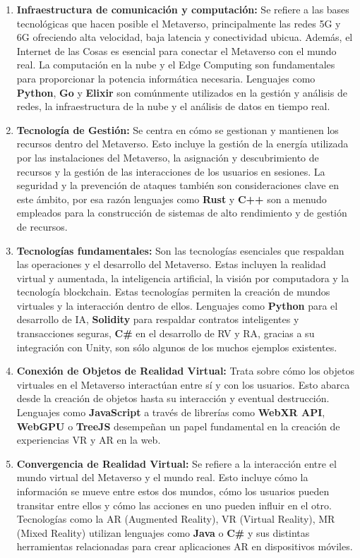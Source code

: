 \documentclass[a4paper,10pt]{article}
\begin{document}
	\begin{enumerate}
		\item \textbf{Infraestructura de comunicación y computación:} Se refiere a las bases tecnológicas que hacen posible el Metaverso, principalmente las redes 5G y 6G ofreciendo alta velocidad, baja latencia y conectividad ubicua. Además, el Internet de las Cosas es esencial para conectar el Metaverso con el mundo real. La computación en la nube y el Edge Computing son fundamentales para proporcionar la potencia informática necesaria. Lenguajes como \textbf{Python}, \textbf{Go} y \textbf{Elixir} son comúnmente utilizados en la gestión y análisis de redes, la infraestructura de la nube y el análisis de datos en tiempo real.
		\item \textbf{Tecnología de Gestión:} Se centra en cómo se gestionan y mantienen los recursos dentro del Metaverso. Esto incluye la gestión de la energía utilizada por las instalaciones del Metaverso, la asignación y descubrimiento de recursos y la gestión de las interacciones de los usuarios en sesiones. La seguridad y la prevención de ataques también son consideraciones clave en este ámbito, por esa razón lenguajes como \textbf{Rust} y \textbf{C++} son a menudo empleados para la construcción de sistemas de alto rendimiento y de gestión de recursos.
		\item \textbf{Tecnologías fundamentales:} Son las tecnologías esenciales que respaldan las operaciones y el desarrollo del Metaverso. Estas incluyen la realidad virtual y aumentada, la inteligencia artificial, la visión por computadora y la tecnología blockchain. Estas tecnologías permiten la creación de mundos virtuales y la interacción dentro de ellos. Lenguajes como \textbf{Python} para el desarrollo de IA, \textbf{Solidity} para respaldar contratos inteligentes y transacciones seguras, \textbf{C\#} en el desarrollo de RV y RA, gracias a su integración con Unity, son sólo algunos de los muchos ejemplos existentes.
		\item \textbf{Conexión de Objetos de Realidad Virtual:} Trata sobre cómo los objetos virtuales en el Metaverso interactúan entre sí y con los usuarios. Esto abarca desde la creación de objetos hasta su interacción y eventual destrucción. Lenguajes como \textbf{JavaScript} a través de librerías como \textbf{WebXR API}, \textbf{WebGPU} o \textbf{TreeJS} desempeñan un papel fundamental en la creación de experiencias VR y AR en la web.
		\item \textbf{Convergencia de Realidad Virtual:} Se refiere a la interacción entre el mundo virtual del Metaverso y el mundo real. Esto incluye cómo la información se mueve entre estos dos mundos, cómo los usuarios pueden transitar entre ellos y cómo las acciones en uno pueden influir en el otro. Tecnologías como la AR (Augmented Reality), VR (Virtual Reality), MR (Mixed Reality) utilizan lenguajes como \textbf{Java} o \textbf{C\#} y sus distintas herramientas relacionadas para crear aplicaciones AR en dispositivos móviles.
	\end{enumerate}
\end{document}

